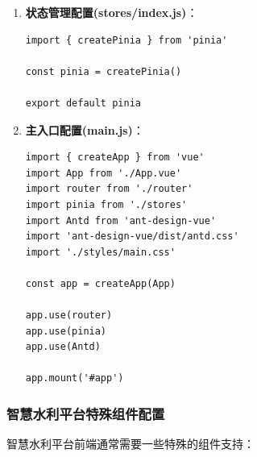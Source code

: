 \begin{enumerate}
\begin{lstlisting}
import { createRouter, createWebHistory } from 'vue-router'

const routes = [
  {
    path: '/',
    name: 'Home',
    component: () => import('../views/Home.vue')
  },
  {
    path: '/monitor',
    name: 'WaterMonitor',
    component: () => import('../views/WaterMonitor.vue')
  },
  {
    path: '/analysis',
    name: 'DataAnalysis',
    component: () => import('../views/DataAnalysis.vue')
  },
  {
    path: '/map',
    name: 'MapViewer',
    component: () => import('../views/MapViewer.vue')
  }
]

const router = createRouter({
  history: createWebHistory('/'),
  routes
})

export default router
\end{lstlisting}
\item
  \textbf{状态管理配置(stores/index.js)}：

\begin{lstlisting}
import { createPinia } from 'pinia'

const pinia = createPinia()

export default pinia
\end{lstlisting}
\item
  \textbf{主入口配置(main.js)}：

\begin{lstlisting}
import { createApp } from 'vue'
import App from './App.vue'
import router from './router'
import pinia from './stores'
import Antd from 'ant-design-vue'
import 'ant-design-vue/dist/antd.css'
import './styles/main.css'

const app = createApp(App)

app.use(router)
app.use(pinia)
app.use(Antd)

app.mount('#app')
\end{lstlisting}
\end{enumerate}

\subsubsection{智慧水利平台特殊组件配置}\label{ux667aux6167ux6c34ux5229ux5e73ux53f0ux7279ux6b8aux7ec4ux4ef6ux914dux7f6e}

智慧水利平台前端通常需要一些特殊的组件支持：

